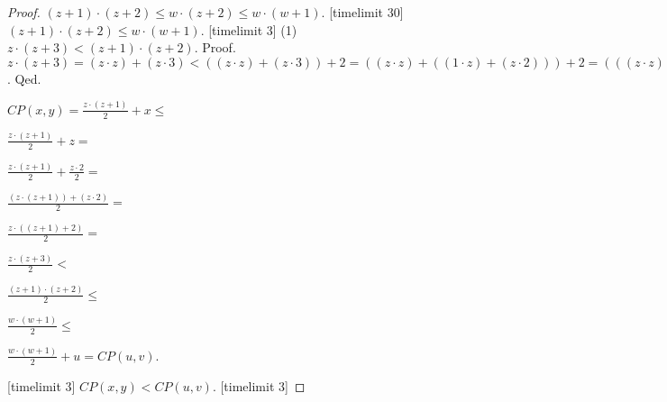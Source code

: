 \documentclass{article}
\begin{document}
\begin{forthel}
\begin{proof}
$(z+1)\cdot(z+2) \leq w \cdot (z+2) \leq w \cdot(w+1)$.
[timelimit 30]
$(z+1)\cdot(z+2) \leq w \cdot(w+1)$. 
[timelimit 3]
(1)$z \cdot(z+3) < (z+1)\cdot(z+2)$.
Proof.
$ z \cdot(z+3) = (z \cdot z) + (z \cdot 3)
< ((z \cdot z) + (z \cdot 3)) + 2
= ((z \cdot z) + ((1 \cdot z) + (z \cdot 2))) + 2 
= (((z \cdot z) + (1 \cdot z)) + (z \cdot 2)) + 2
= ((z \cdot z) + (1 \cdot z)) + ((z \cdot 2) + (1 \cdot 2))
= ((z +1) \cdot z) + ((z+1) \cdot 2)
= (z+1)\cdot(z+2)$.
Qed.

$CP(x,y) = \frac{z\cdot(z+1)}{2} + x \leq$

$\frac{z\cdot(z+1)}{2} + z =$

$\frac{z\cdot(z+1)}{2} + \frac{z \cdot 2}{2} =$

$\frac{(z\cdot(z+1)) + (z \cdot 2)}{2} =$

$\frac{z \cdot((z+1) + 2)}{2} =$

$\frac{z \cdot (z+3)}{2} <$


$\frac{(z+1)\cdot(z+2)}{2} \leq$

$\frac{w \cdot(w+1)}{2} \leq$

$\frac{w \cdot(w+1)}{2} + u = CP(u,v)$.

[timelimit 3]
$CP(x,y) < CP(u,v)$.
[timelimit 3]

\end{proof}



\end{forthel}
\end{document}
